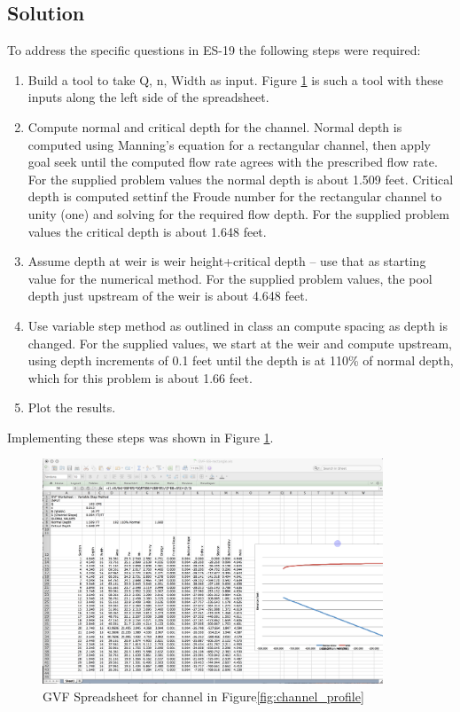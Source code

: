 \documentclass[12pt]{article}
\begin{document}
\begin{enumerate}
\section*{\small{Solution}}
To address the specific questions in ES-19 the following steps were required:
\begin{enumerate}
\item Build a tool to take Q, n, Width as input. Figure \ref{fig:GVF-UpperLeft} is such a tool with these inputs along the left side of the spreadsheet.
\item Compute normal and critical depth for the channel.
Normal depth is computed using Manning's equation for a rectangular channel, then apply goal seek until the computed flow rate agrees with the prescribed flow rate.  For the supplied problem values the normal depth is about 1.509 feet.  Critical depth is computed settinf the Froude number for the rectangular channel to unity (one) and solving for the required flow depth.  For the supplied problem values the critical depth is about 1.648 feet.
\item Assume depth at weir is weir height+critical depth -- use that as starting value for the numerical method.  For the supplied problem values, the pool depth just upstream of the weir is about 4.648 feet.
\item Use variable step method as outlined in class an compute spacing as depth is changed.  For the supplied values, we start at the weir and compute upstream, using depth increments of 0.1 feet until the depth is at 110\% of normal depth, which for this problem is about 1.66 feet.
\item Plot the results.
\end{enumerate}

Implementing these steps was shown in Figure \ref{fig:GVF-UpperLeft}.

\begin{figure}[htbp] %
   \centering
   \includegraphics[width=4in]{GVF-UpperLeft.jpg} 
   \caption{GVF Spreadsheet for channel in Figure\ref{fig:channel_profile}}
   \label{fig:GVF-UpperLeft}
\end{figure}


\end{enumerate}
\end{document}
